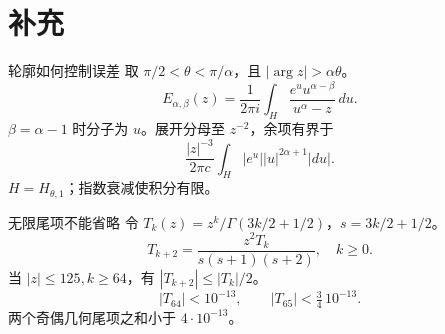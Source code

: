 \documentclass{beamer}
\begin{document}
\section{补充}
\begin{frame}{轮廓如何控制误差}
取 $\pi/2{<} \theta{<} \pi/\alpha$，且 $|\arg z|>\alpha\theta$。
\[
E_{\alpha,\beta}(z)=\frac1{2\pi i}\int_H\frac{e^u u^{\alpha-\beta}}{u^\alpha-z}\,du.
\]
$\beta=\alpha-1$ 时分子为 $u$。展开分母至 $z^{-2}$，余项有界于
\[
\frac{|z|^{-3}}{2\pi c}\int_H|e^u||u|^{2\alpha+1}|du|.
\]
$H=H_{\theta,1}$；指数衰减使积分有限。
\end{frame}
\begin{frame}{无限尾项不能省略}
令 $T_k(z)=z^k/\Gamma(3k/2+1/2)$，$s=3k/2+1/2$。
\[
T_{k+2}=\frac{z^2T_k}{s(s+1)(s+2)},\quad k\ge0.
\]
当 $|z|\le125,k\ge64$，有 $|T_{k+2}|\le|T_k|/2$。
\[
|T_{64}|{<} 10^{-13},\qquad |T_{65}|{<} \tfrac34\,10^{-13}.
\]
两个奇偶几何尾项之和小于 $4\cdot10^{-13}$。
\end{frame}
\FormalVerification
\end{document}
